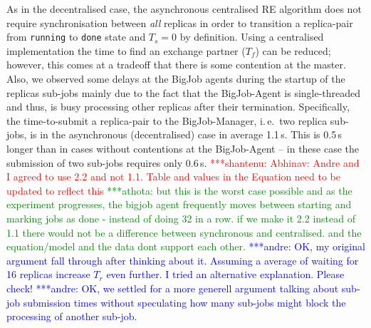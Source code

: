 \documentclass{rspublic}
\newcommand{\jhanote}[1]{ {\textcolor{red} { ***shantenu: #1 }}}
\newcommand{\alnote}[1]{ {\textcolor{blue} { ***andre: #1 }}}
\newcommand{\athotanote}[1]{ {\textcolor{green} { ***athota: #1 }}}
\newcommand{\alnote}[1]{}
\newcommand{\athotanote}[1]{}
\newcommand{\jhanote}[1]{}
\begin{document}
As in the decentralised case, the asynchronous centralised RE
algorithm does not require synchronisation between {\it all} replicas
in order to transition a replica-pair from \texttt{run\-ning} to
\texttt{done} state and $T_s = 0$ by definition. Using a centralised
implementation the time to find an exchange partner ($T_f$) can be
reduced; however, this comes at a tradeoff that there is some
contention at the master. Also, we observed some delays at the BigJob
agents during the startup of the replicas sub-jobs mainly due to the
fact that the BigJob-Agent is single-threaded and thus, is busy
processing other replicas after their termination.  Specifically, the
time-to-submit a replica-pair to the BigJob-Manager, 
i.\,e.\ two replica sub-jobs, is in the asynchronous (decentralised) case 
in average 1.1\,s. This is 0.5\,s longer than in cases
without contentions at the BigJob-Agent -- in these case the submission
of two sub-jobs requires only 0.6\,s.
\jhanote{Abhinav: Andre and I
  agreed to use 2.2 and not 1.1. Table and values in the Equation need
  to be updated to reflect this} \athotanote{but this is the worst
  case possible and as the experiment progresses, the bigjob agent
  frequently moves between starting and marking jobs as done - instead
  of doing 32 in a row. if we make it 2.2 instead of 1.1 there would
  not be a difference between synchronous and centralised. and the
  equation/model and the data dont support each other.} \alnote{OK,
  my original argument fall through after thinking about it. Assuming
  a average of waiting for 16 replicas increase $T_r$ even further. 
  I tried an alternative explanation. Please check!} \alnote{OK,
  we settled for a more generell argument talking about sub-job
  submission times without speculating how many sub-jobs might
  block the processing of another sub-job.}
\end{document}
